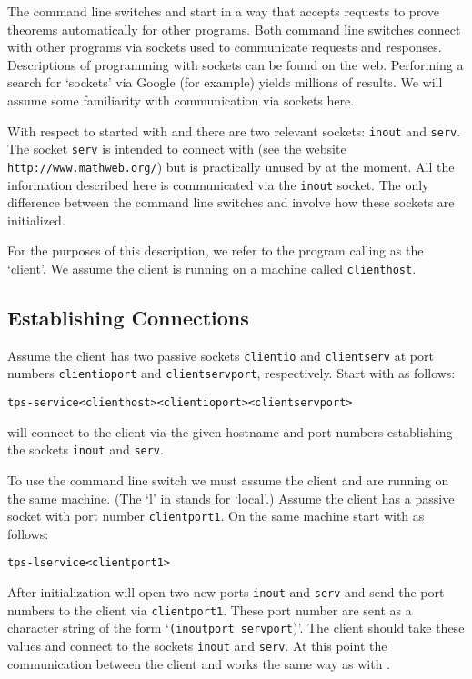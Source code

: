 The command line switches
 and 
start {\TPS} in a way that accepts requests to prove theorems automatically for
other programs.  Both command line switches connect with other programs
via sockets used to communicate requests and responses.
Descriptions of programming with sockets can be found on the web.
Performing a search for `sockets' via Google (for example) yields millions of results.
We will assume some familiarity with communication via sockets here.

With respect to {\TPS} started with  and 
there are two relevant sockets: {\tt inout} and {\tt serv}.
The socket {\tt serv} is intended to connect {\TPS} with 
(see the website {\tt http://www.mathweb.org/})
but is practically unused by {\TPS} at the moment.
All the information described here
is communicated via the {\tt inout} socket.
The only difference between the command line switches
 and 
involve how these sockets are initialized.

For the purposes of this description, we refer
to the program calling {\TPS} as the `client'.
We assume the client is running on a machine called {\tt clienthost}.

\subsection{Establishing Connections}

Assume the client has two passive sockets {\tt clientio} and {\tt clientserv}
at port numbers {\tt clientioport} and {\tt clientservport}, respectively.
Start {\TPS} with  as follows:
\begin{alltt}
tps -service <clienthost> <clientioport> <clientservport>
\end{alltt}
{\TPS} will connect to the client via the given hostname and port numbers
establishing the {\TPS} sockets {\tt inout} and {\tt serv}.

To use the command line switch 
we must assume the client and {\TPS} are running on the same machine.
(The `l' in  stands for `local'.)
Assume the client has a passive socket
with port number {\tt clientport1}.  On the same machine start {\TPS} with
 as follows:
\begin{alltt}
tps -lservice <clientport1>
\end{alltt}
After initialization {\TPS} will open two new ports {\tt inout} and {\tt serv}
and send the port numbers to the client via {\tt clientport1}.
These port number are sent as a character string of the form
`{\tt (inoutport servport})'.
The client should take these values and connect to the sockets {\tt inout} and {\tt serv}.
At this point the communication between the client and {\TPS} works the same
way as with .

